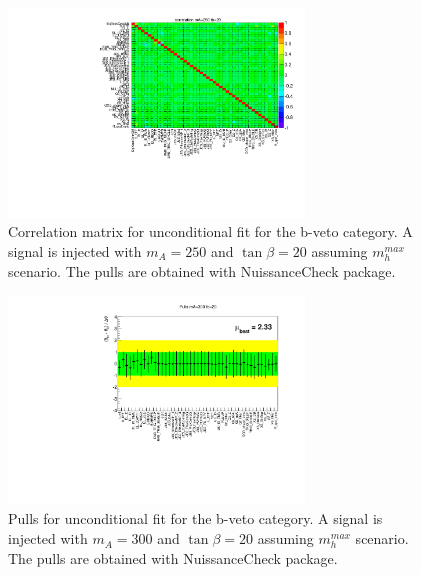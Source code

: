 \begin{figure}[!hb]
  \centering
  \includegraphics[width=0.7\textwidth]{figure/limits/matrix_250.pdf}
  \caption{Correlation matrix for unconditional fit for the b-veto category. A signal is injected with 
	$m_A=250$ and  $\tan\beta=20$ assuming $m_h^{max}$ scenario. The pulls are obtained with NuissanceCheck package.  }

\end{figure}

\begin{figure}[!hb]
  \centering
  \includegraphics[width=0.7\textwidth]{figure/limits/pulls_300.pdf}
  \caption{Pulls for unconditional fit for the b-veto category. A signal is injected with 
	$m_A=300$ and  $\tan\beta=20$ assuming $m_h^{max}$ scenario. The pulls are obtained with NuissanceCheck package.  }

\end{figure}

